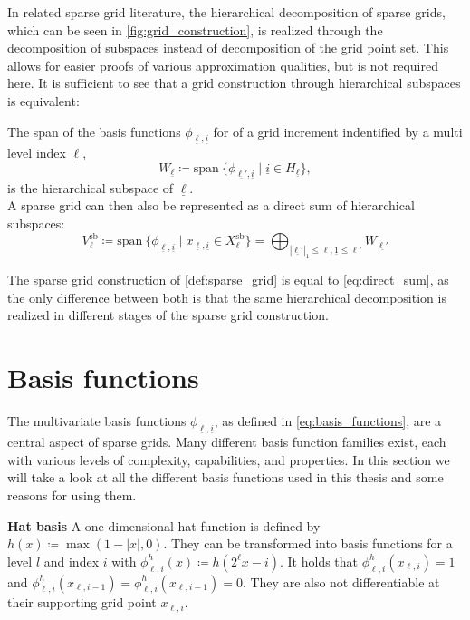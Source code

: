 \documentclass[
  a4paper,  %
  twoside,  %
  bibliography=totoc,
  headsepline,
  cleardoublepage=empty,
  parskip=half,
  draft=false
]{scrbook}
\begin{document}
In related sparse grid literature, the hierarchical decomposition of sparse grids, which can be seen in \cref{fig:grid_construction}, is realized through the decomposition of subspaces instead of decomposition of the grid point set.
This allows for easier proofs of various approximation qualities, but is not required here.
It is sufficient to see that a grid construction through hierarchical subspaces is equivalent:
\begin{definition}
The span of the basis functions $\phi_{\underline{\ell},\underline{i}}$ for of a grid increment indentified by a multi level index $\underline{\ell}$,
\begin{equation}
W_{\underline{\ell}} \coloneqq \text{span}~ \{\phi_{\underline{\ell'},\underline{i}} \mid \underline{i} \in H_{\underline{\ell}}\},
\end{equation}
is the hierarchical subspace of $\underline{\ell}$.\\
A sparse grid can then also be represented as a direct sum of hierarchical subspaces:
\begin{equation}
V^{\text{sb}}_{\ell} \coloneqq \text{span}~ \{\phi_{\underline{\ell},\underline{i}} \mid x_{\underline{\ell},\underline{i}} \in X^{\text{sb}}_{\ell}\}=\bigoplus_{|\underline{\ell'}|_1 \leq \ell, \underline{1} \leq \ell'} W_{\underline{\ell'}}
\label{eq:direct_sum}
\end{equation}
\end{definition}
The sparse grid construction of \cref{def:sparse_grid} is equal to \cref{eq:direct_sum}, as the only difference between both is that the same hierarchical decomposition is realized in different stages of the sparse grid construction.

\section{Basis functions}

The multivariate basis functions $\phi_{\underline{\ell},\underline{i}}$, as defined in \cref{eq:basis_functions}, are a central aspect of sparse grids.
Many different basis function families exist, each with various levels of complexity, capabilities, and properties.
In this section we will take a look at all the different basis functions used in this thesis and some reasons for using them.

\vspace{0.3em}
\textbf{Hat basis }
A one-dimensional hat function is defined by $h(x) \coloneqq \max(1 - |x|,0)$.
They can be transformed into basis functions for a level $l$ and index $i$ with $\phi^h_{\ell,i}(x) \coloneqq h(2^\ell x-i)$.
It holds that $\phi^h_{\ell,i}(x_{\ell,i})=1$ and $\phi^h_{\ell,i}(x_{\ell,i-1})=\phi^h_{\ell,i}(x_{\ell,i-1})=0$.
They are also not differentiable at their supporting grid point $x_{\ell,i}$.
\end{document}
